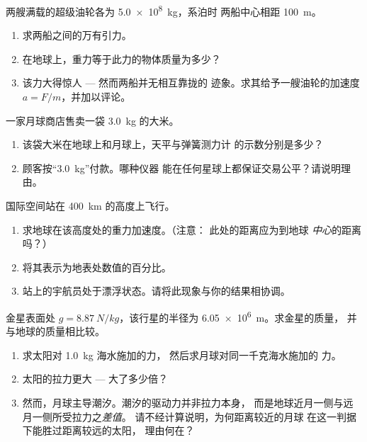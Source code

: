 \begin{exercise}[$\star\star$]\label{exo:g10:universal-gravitation:6}
两艘满载的超级油轮各为 \qty{5.0e8}{kg}，系泊时
两船中心相距 \qty{100}{m}。
\begin{enumerate}
  \item 求两船之间的万有引力。
  \item 在地球上，重力等于此力的物体质量为多少？
  \item 该力大得惊人 --- 然而两船并无相互靠拢的
        迹象。求其给予一艘油轮的加速度
        $a = F/m$，并加以评论。
\end{enumerate}
\end{exercise}

\begin{exercise}[$\star\star$]\label{exo:g10:universal-gravitation:7}
一家月球商店售卖一袋 \qty{3.0}{kg} 的大米。
\begin{enumerate}
  \item 该袋大米在地球上和月球上，天平与弹簧测力计
        的示数分别是多少？
  \item 顾客按“\qty{3.0}{kg}”付款。哪种仪器
        能在任何星球上都保证交易公平？请说明理由。
\end{enumerate}
\end{exercise}

\begin{exercise}[$\star\star$]\label{exo:g10:universal-gravitation:8}
国际空间站在 \qty{400}{km} 的高度上飞行。
\begin{enumerate}
  \item 求地球在该高度处的重力加速度。（注意：
        此处的距离应为到地球
        \emph{中心}的距离吗？）
  \item 将其表示为地表处数值的百分比。
  \item 站上的宇航员处于漂浮状态。请将此现象与你的结果相协调。
\end{enumerate}
\end{exercise}

\begin{exercise}[$\star\star$]\label{exo:g10:universal-gravitation:9}
金星表面处 $g = \qty{8.87}{N/kg}$，该行星的半径为
\qty{6.05e6}{m}。求金星的质量，
并与地球的质量相比较。
\end{exercise}

\begin{exercise}[$\star\star$]\label{exo:g10:universal-gravitation:10}
\begin{enumerate}
  \item 求太阳对 \qty{1.0}{kg} 海水施加的力，
        然后求月球对同一千克海水施加的
        力。
  \item 太阳的拉力更大 --- 大了多少倍？
  \item 然而，月球主导潮汐。潮汐的驱动力并非拉力本身，
        而是地球近月一侧与远月一侧所受拉力之\emph{差值}。
        请不经计算说明，为何距离较近的月球
        在这一判据下能胜过距离较远的太阳，
        理由何在？
\end{enumerate}
\end{exercise}

